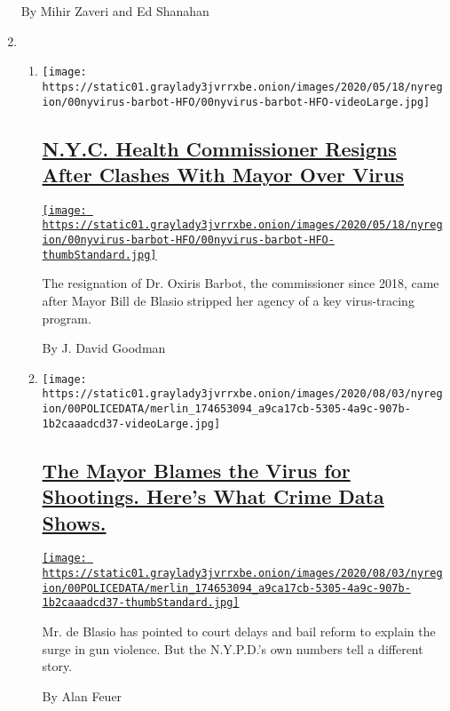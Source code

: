 \begin{enumerate}
  By Mihir Zaveri and Ed Shanahan
\item
  \begin{enumerate}
  \def\labelenumii{\arabic{enumii}.}
  \item
    \texttt{[image: https://static01.graylady3jvrrxbe.onion/images/2020/05/18/nyregion/00nyvirus-barbot-HFO/00nyvirus-barbot-HFO-videoLarge.jpg]}

    \hypertarget{nyc-health-commissioner-resigns-after-clashes-with-mayor-over-virus}{%
    \subsection{\texorpdfstring{\href{/2020/08/04/nyregion/oxiris-barbot-health-commissioner-resigns.html}{N.Y.C.
    Health Commissioner Resigns After Clashes With Mayor Over
    Virus}}{N.Y.C. Health Commissioner Resigns After Clashes With Mayor Over Virus}}\label{nyc-health-commissioner-resigns-after-clashes-with-mayor-over-virus}}

    \href{/2020/08/04/nyregion/oxiris-barbot-health-commissioner-resigns.html}{\texttt{[image: https://static01.graylady3jvrrxbe.onion/images/2020/05/18/nyregion/00nyvirus-barbot-HFO/00nyvirus-barbot-HFO-thumbStandard.jpg]}}

    The resignation of Dr. Oxiris Barbot, the commissioner since 2018,
    came after Mayor Bill de Blasio stripped her agency of a key
    virus-tracing program.

    By J. David Goodman
  \item
    \texttt{[image: https://static01.graylady3jvrrxbe.onion/images/2020/08/03/nyregion/00POLICEDATA/merlin\_174653094\_a9ca17cb-5305-4a9c-907b-1b2caaadcd37-videoLarge.jpg]}

    \hypertarget{the-mayor-blames-the-virus-for-shootings-heres-what-crime-data-shows}{%
    \subsection{\texorpdfstring{\href{/2020/08/04/nyregion/nyc-shootings-coronavirus.html}{The
    Mayor Blames the Virus for Shootings. Here's What Crime Data
    Shows.}}{The Mayor Blames the Virus for Shootings. Here's What Crime Data Shows.}}\label{the-mayor-blames-the-virus-for-shootings-heres-what-crime-data-shows}}

    \href{/2020/08/04/nyregion/nyc-shootings-coronavirus.html}{\texttt{[image: https://static01.graylady3jvrrxbe.onion/images/2020/08/03/nyregion/00POLICEDATA/merlin\_174653094\_a9ca17cb-5305-4a9c-907b-1b2caaadcd37-thumbStandard.jpg]}}

    Mr. de Blasio has pointed to court delays and bail reform to explain
    the surge in gun violence. But the N.Y.P.D.'s own numbers tell a
    different story.

    By Alan Feuer
  \end{enumerate}
\end{enumerate}

